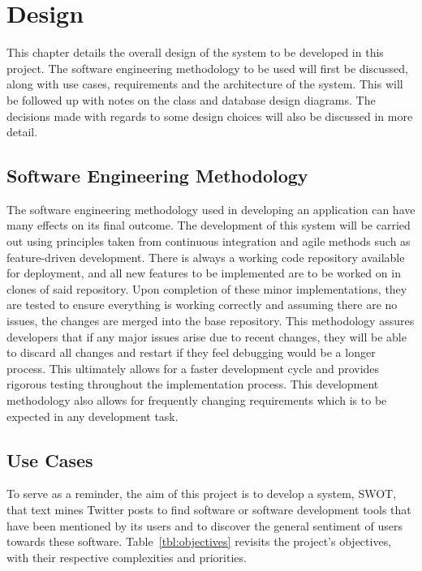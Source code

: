 \chapter{Design}
\label{cha:design}
This chapter details the overall design of the system to be developed in this project. The software engineering methodology to be used will first be discussed, along with use cases, requirements and the architecture of the system. This will be followed up with notes on the class and database design diagrams. The decisions made with regards to some design choices will also be discussed in more detail.

\section{Software Engineering Methodology}
The software engineering methodology used in developing an application can have many effects on its final outcome. The development of this system will be carried out using principles taken from continuous integration and agile methods such as feature-driven development. There is always a working code repository available for deployment, and all new features to be implemented are to be worked on in clones of said repository. Upon completion of these minor implementations, they are tested to ensure everything is working correctly and assuming there are no issues, the changes are merged into the base repository. This methodology assures developers that if any major issues arise due to recent changes, they will be able to discard all changes and restart if they feel debugging would be a longer process. This ultimately allows for a faster development cycle and provides rigorous testing throughout the implementation process. This development methodology also allows for frequently changing requirements which is to be expected in any development task.

\section{Use Cases}
\label{sec:uc}
To serve as a reminder, the aim of this project is to develop a system, SWOT, that text mines Twitter posts to find software or software development tools that have been mentioned by its users and to discover the general sentiment of users towards these software. Table~\ref{tbl:objectives} revisits the project's objectives, with their respective complexities and priorities.

